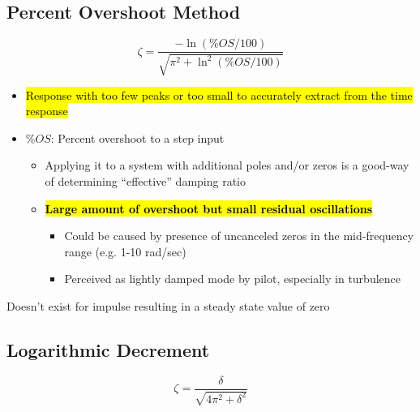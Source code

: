 \documentclass[10pt]{report}
\begin{document}
\subsection{Percent Overshoot Method}


$$\zeta = \frac{-\ln(\%OS/100)}{\sqrt{\pi^2 + \ln^2(\%OS/100)}}$$

\begin{itemize}
\item \hl{Response with too few peaks or too small to accurately extract from the time response}
\item $\%OS$: Percent overshoot to a step input

\begin{itemize}
\item Applying it to a system with additional poles and/or zeros is a good-way of determining “effective” damping ratio

\item \textbf{\hl{Large amount of overshoot but small residual oscillations}}

\begin{itemize}
\item Could be caused by presence of uncanceled zeros in the mid-frequency range (e.g. 1-10 rad/sec)

\item Perceived as lightly damped mode by pilot, especially in turbulence 

\end{itemize}
\end{itemize}
\end{itemize}

\begin{advtcolorbox}
Doesn’t exist for impulse resulting in a steady state value of zero 

\end{advtcolorbox}

\subsection{Logarithmic Decrement}

$$\zeta = \frac{\delta}{\sqrt{4\pi^2 + \delta^2}}$$
\end{document}
